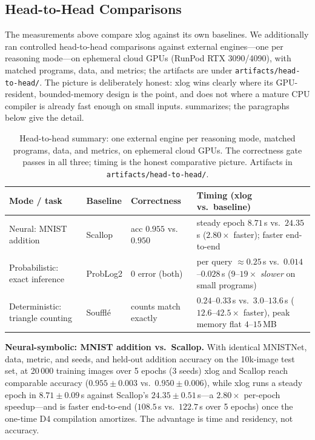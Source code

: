 \subsection{Head-to-Head Comparisons}\label{sec:h2h}

The measurements above compare xlog against its own baselines. We additionally ran controlled head-to-head comparisons against external engines---one per reasoning mode---on ephemeral cloud GPUs (RunPod RTX 3090/4090), with matched programs, data, and metrics; the artifacts are under \texttt{artifacts/head-to-head/}. The picture is deliberately honest: xlog wins clearly where its GPU-resident, bounded-memory design is the point, and does not where a mature CPU compiler is already fast enough on small inputs.  summarizes; the paragraphs below give the detail.

\begin{table}[htbp]
  \centering
  \caption{Head-to-head summary: one external engine per reasoning mode, matched programs, data, and metrics, on ephemeral cloud GPUs. The correctness gate passes in all three; timing is the honest comparative picture. Artifacts in \texttt{artifacts/head-to-head/}.}
  \label{tab:h2h}
  \small
  \begin{tabularx}{\linewidth}{@{}l l l L@{}}
    \toprule
    \textbf{Mode / task} & \textbf{Baseline} & \textbf{Correctness} & \textbf{Timing (xlog vs.\ baseline)} \\
    \midrule
    Neural: MNIST addition           & Scallop  & acc $0.955$ vs.\ $0.950$ & steady epoch $8.71$\,s vs.\ $24.35$\,s ($\mathbf{2.80\times}$ faster); faster end-to-end \\
    Probabilistic: exact inference   & ProbLog2 & $0$ error (both) & per query ${\approx}0.25$\,s vs.\ $0.014$--$0.028$\,s ($9$--$19\times$ \emph{slower} on small programs) \\
    Deterministic: triangle counting & Soufflé  & counts match exactly & $0.24$--$0.33$\,s vs.\ $3.0$--$13.6$\,s ($\mathbf{12.6}$--$\mathbf{42.5\times}$ faster), peak memory flat $4$--$15$\,MB \\
    \bottomrule
  \end{tabularx}
\end{table}

\textbf{Neural-symbolic: MNIST addition vs.\ Scallop.} With identical MNISTNet, data, metric, and seeds, and held-out addition accuracy on the 10k-image test set, at 20\,000 training images over 5 epochs (3 seeds) xlog and Scallop reach comparable accuracy ($0.955 \pm 0.003$ vs.\ $0.950 \pm 0.006$), while xlog runs a steady epoch in $8.71 \pm 0.09$\,s against Scallop's $24.35 \pm 0.51$\,s---a $2.80\times$ per-epoch speedup---and is faster end-to-end ($108.5$\,s vs.\ $122.7$\,s over 5 epochs) once the one-time D4 compilation amortizes. The advantage is time and residency, not accuracy.

